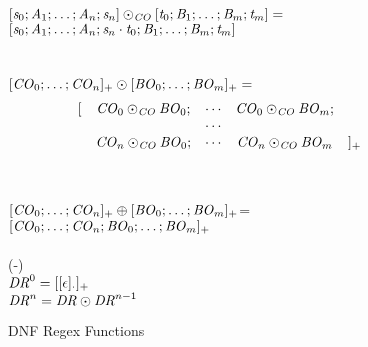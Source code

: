 \begin{figure}
\ConcatConjunct{} \OfType{} \ArrowTypeOf{\ConjunctType{}}{\ArrowTypeOf{\ConjunctType{}}{\ConjunctType{}}}\\
$[\mathit{s}_0;\mathit{A}_1;\ldots;\mathit{A}_n;\mathit{s}_n]\odot_{\mathit{CO}}[\mathit{t}_0;\mathit{B}_1;\ldots;\mathit{B}_m;\mathit{t}_m]=$\\
\hspace*{2ex}$[\mathit{s}_0;\mathit{A}_1;\ldots;\mathit{A}_n;\mathit{s}_n\cdot\mathit{t}_0;\mathit{B}_1;\ldots;\mathit{B}_m;\mathit{t}_m]$\\
\\
\ConcatDNF{} \OfType{} \ArrowTypeOf{\DNFRegexType{}}{\ArrowTypeOf{\DNFRegexType{}}{\DNFRegexType{}}}\\
$[\mathit{CO}_0;\ldots;\mathit{CO}_n]_{+}\odot[\mathit{BO}_0;\ldots;\mathit{BO}_m]_{+}=$
\[
\begin{array}{rcccl}
[ & \mathit{CO}_0\odot_{\mathit{CO}}\mathit{BO}_0; & \cdots & \mathit{CO}_0\odot_{\mathit{CO}}\mathit{BO}_m; \\
& & \cdots & \\
& \mathit{CO}_n\odot_{\mathit{CO}}\mathit{BO}_0; & \cdots & \mathit{CO}_n\odot_{\mathit{CO}}\mathit{BO}_m & ]_{+}
\end{array}
\]
\\
\OrDNF{} \OfType{} \ArrowTypeOf{\DNFRegexType{}}{\DNFRegexType{}}\\
$[\mathit{CO}_0;\ldots;\mathit{CO}_n]_{+}\oplus[\mathit{BO}_0;\ldots;\mathit{BO}_m]_{+}$=\\
\hspace*{2ex}$[\mathit{CO}_0;\ldots;\mathit{CO}_n;\mathit{BO}_0;\ldots;\mathit{BO}_m]_{+}$\\
\\
(-) \OfType{} \ArrowTypeOf{\DNFRegexType{}}{\DNFRegexType{}}\\
$\mathit{DR}^{0}=[[\epsilon]_{\cdot}]_{+}$\\
$\mathit{DR}^{n}=\mathit{DR}\odot\mathit{DR}^{n-1}$\\
\caption{DNF Regex Functions} 
\label{fig:dnf-regex-functions}
\end{figure}
